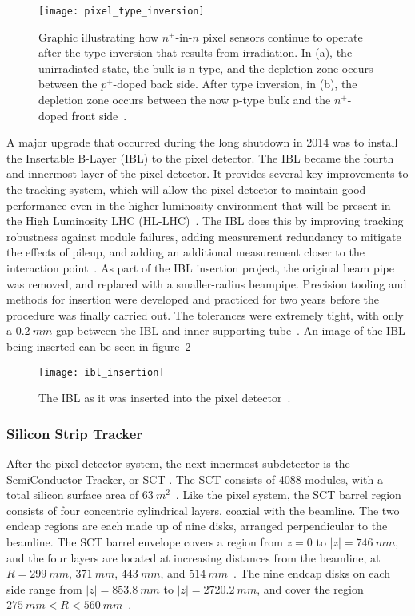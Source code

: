 \begin{figure}[!ht]\centering
\texttt{[image: pixel\_type\_inversion]}
\caption{Graphic illustrating how $n^+$-in-$n$ pixel sensors continue to operate after the type inversion that results from irradiation.
In (a), the unirradiated state, the bulk is n-type, and the depletion zone occurs between the $p^+$-doped back side.
After type inversion, in (b), the depletion zone occurs between the now p-type bulk and the $n^+$-doped front side~\cite{pixels-2008}.}
\label{fig:pixel_type_inversion}
\end{figure}

A major upgrade that occurred during the long shutdown in 2014 was to install the Insertable B-Layer (IBL) to the pixel detector.
The IBL became the fourth and innermost layer of the pixel detector.
It provides several key improvements to the tracking system, which will allow the pixel detector to maintain good performance even in the higher-luminosity environment that will be present in the High Luminosity LHC (HL-LHC)~\cite{ibl-tdr}.
The IBL does this by improving tracking robustness against module failures, adding measurement redundancy to mitigate the effects of pileup, and adding an additional measurement closer to the interaction point~\cite{ibl-tdr}.
As part of the IBL insertion project, the original beam pipe was removed, and replaced with a smaller-radius beampipe.
Precision tooling and methods for insertion were developed and practiced for two years before the procedure was finally carried out.
The tolerances were extremely tight, with only a $0.2~mm$ gap between the IBL and inner supporting tube~\cite{ibl-website}.
An image of the IBL being inserted can be seen in figure~\ref{fig:ibl_insertion}

\begin{figure}[!ht]\centering
\texttt{[image: ibl\_insertion]}
\caption{The IBL as it was inserted into the pixel detector~\cite{ibl-website}.}
\label{fig:ibl_insertion}
\end{figure}

\subsubsection{Silicon Strip Tracker}\label{subsubsec:sct}

After the pixel detector system, the next innermost subdetector is the SemiConductor Tracker, or SCT .
The SCT consists of 4088 modules, with a total silicon surface area of $63~m^2$~\cite{atlas-detector-2008}.
Like the pixel system, the SCT barrel region consists of four concentric cylindrical layers, coaxial with the beamline.
The two endcap regions are each made up of nine disks, arranged perpendicular to the beamline.
The SCT barrel envelope covers a region from $z = 0$ to $|z|  = 746~mm$, and the four layers are located at increasing distances from the beamline, at $R = 299~mm$, $371~mm$, $443~mm$, and $514~mm$~\cite{sct-barrel-2006}.
The nine endcap disks on each side range from $|z| = 853.8~mm$ to $|z| = 2720.2~mm$, and cover the region $275~mm < R < 560~mm$~\cite{atlas-detector-2008}.


